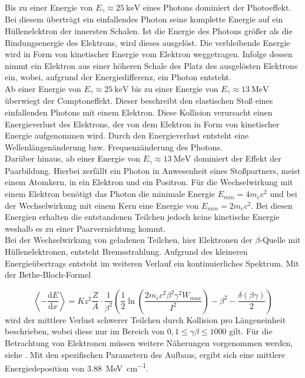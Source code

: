 Bis zu einer Energie von $E_\gamma \approx \SI{25}{\kilo\electronvolt}$ \cite{blub} eines Photons dominiert der Photoeffekt. Bei diesem überträgt ein einfallendes Photon seine komplette Energie auf ein Hüllenelektron der innersten Schalen. Ist die Energie des Photons größer als die Bindungsenergie des Elektrons, wird dieses ausgelöst. Die verbleibende Energie wird in Form von kinetischer Energie vom Elektron weggetragen. Infolge dessen nimmt ein Elektron aus einer höheren Schale des Platz des ausgelösten Elektrons ein, wobei, aufgrund der Energiedifferenz, ein Photon entsteht.\\

Ab einer Energie von $E_\gamma \approx \SI{25}{\kilo\electronvolt}$ \cite{blub} bis zu einer Energie von $E_\gamma \approx \SI{13}{\mega\electronvolt}$ \cite{blub} überwiegt der Comptoneffekt. Dieser beschreibt den elastischen Stoß eines einfallenden Photons mit einem Elektron. Diese Kollision verursacht einen Energieverlust des Elektrons, der von dem Elektron in Form von kinetischer Energie aufgenommen wird. Durch den Energieverlust entsteht eine Wellenlängenänderung bzw. Frequenzänderung des Photons.\\

Darüber hinaus, ab einer Energie von $E_\gamma \approx \SI{13}{\mega\electronvolt}$ \cite{blub} dominiert der Effekt der Paarbildung. Hierbei zerfällt ein Photon in Anwesenheit eines Stoßpartners, meist einem Atomkern, in ein Elektron und ein Positron. Für die Wechselwirkung mit einem Elektron benötigt das Photon die minimale Energie $E_{min}=4m_ec^2$ und bei der Wechselwirkung mit einem Kern eine Energie von $E_{min}=2m_ec^2$. Bei diesen Energien erhalten die entstandenen Teilchen jedoch keine kinetische Energie weshalb es zu einer Paarvernichtung kommt. \\

Bei der Wechselwirkung von geladenen Teilchen, hier Elektronen der $\beta$-Quelle mit Hüllenelektronen, entsteht Bremsstrahlung. Aufgrund des kleineren Energieübertrags entsteht im weiteren Verlauf ein kontinuierliches Spektrum. Mit der Bethe-Bloch-Formel  

\begin{equation}
    \label{Bloch}
    \left< -\frac{\text{d}E}{\text{d}x}\right>=Kz^2\frac{Z}{A}\cdot \frac{1}{\beta^2}\left(\frac{1}{2}\ln{\left(\frac{2m_ec^2\beta^2\gamma^2W_{max}}{I^2}\right)}-\beta^2-\frac{\delta(\beta\gamma)}{2}\right)
\end{equation}
wird der mittlere Verlust schwerer Teilchen durch Kollision pro Längeneinheit beschrieben, wobei diese nur im Bereich von $0,1 \leq \gamma\beta \leq 1000$ gilt. Für die Betrachtung von Elektronen müssen weitere Näherungen vorgenommen werden, siehe \cite{skript}. Mit den spezifischen Parametern des Aufbaus, ergibt sich eine mittlere Energiedeposition von \SI{3.88}{\mega\electronvolt\per\centi\meter}.

